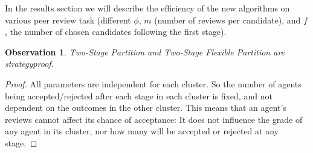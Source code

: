 \documentclass[letterpaper]{article} %
\newcommand{\oshri}[1]{\textcolor{blue}{\textbf{Oshri Says:} #1 }}
\newtheorem{observation}{Observation}
\begin{document}

In the results section we will describe the efficiency of the new algorithms on various peer review task (different $\phi$, $m$ (number of reviews per candidate), and $f$, the number of chosen candidates following the first stage). %

\begin{observation}
Two-Stage Partition and Two-Stage Flexible Partition are strategyproof.
\end{observation}
\begin{proof}
All parameters are independent for each cluster. So the number of agents being accepted/rejected after each stage in each cluster is fixed, and not dependent on the outcomes in the other cluster. This means that an agent's reviews cannot affect its chance of acceptance: It does not influence the grade of any agent in its cluster, nor how many will be accepted or rejected at any stage.
\end{proof}
\end{document}
